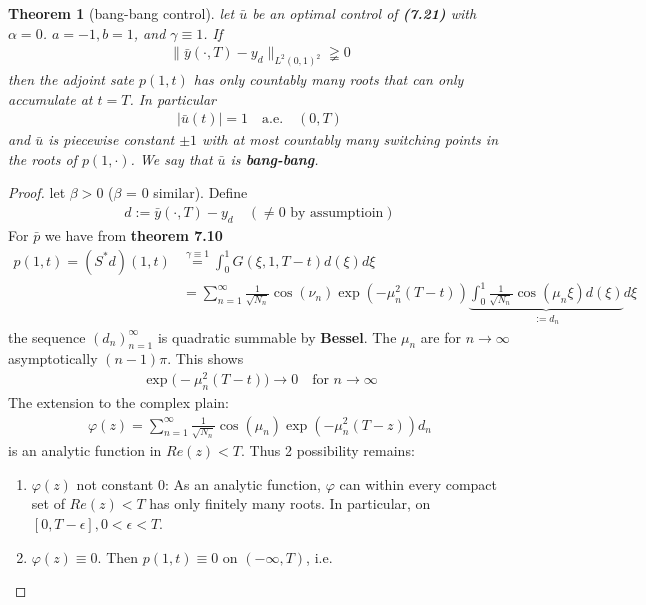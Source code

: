 \documentclass[a4paper,11pt,fleqn]{book}
\newtheorem{theorem}{Theorem}[section]
\theoremstyle{definition}
\theoremstyle{remark}
\begin{document}
\begin{theorem}[bang-bang control]
	let $\bar{u}$ be an optimal control of \textbf{(7.21)} with $\alpha = 0$. $a = -1, b = 1$, and $\gamma \equiv 1$. If 
	\begin{align*}
		\|\bar{y}( \cdot, T) - y_d \|_{L^2(0, 1)^2} \gneqq 0
	\end{align*}
	then the adjoint sate $p(1, t)$ has only countably many roots that can only accumulate at $t = T$. In particular
	\begin{align*}
		|\bar{u}(t)| = 1 \quad \text{a.e.} \quad (0, T)
	\end{align*}
	and $\bar{u}$ is piecewise constant $\pm 1$ with at most countably many switching points in the roots of $p(1, \cdot)$. We say that $\bar{u}$ is \textbf{bang-bang}.
\end{theorem}
\begin{proof}
	let $\beta > 0$ ($\beta$ = 0 similar). Define
	\begin{align*}
		d:= \bar{y} (\cdot, T) - y_d \quad (\neq 0 \text{ by assumptioin})
	\end{align*}
	For $\bar{p}$ we have from \textbf{theorem 7.10}
	\begin{align*}
		p(1, t) = (S^* d)(1, t) &\overset{\gamma \equiv 1}{=} \int_0^1 G(\xi, 1, T - t) d(\xi) d\xi\\
		&= \sum_{n = 1}^\infty \frac{1}{\sqrt{N_n}} \cos(\nu_n) \exp( - \mu_n^2(T - t)) \underbrace{\int_0^1  \frac{1}{\sqrt{N_n}} \cos(\mu_n \xi) d(\xi)}_{:= d_n} d\xi
	\end{align*}
	the sequence $(d_n)^\infty_{n = 1}$ is quadratic summable by \textbf{Bessel}. The $\mu_n$ are for $n \rightarrow \infty$ asymptotically $(n - 1) \pi$. This shows
	\begin{align*}
		\exp\bigg( - \mu_n^2(T - t) \bigg) \rightarrow 0 \quad \text{for } n \rightarrow \infty
	\end{align*}
	The extension to the complex plain:
	\begin{align*}
		\varphi(z) = \sum_{n = 1}^\infty \frac{1}{\sqrt{N_n}} \cos(\mu_n) \exp(-\mu_n^2 (T - z) ) d_n
	\end{align*}
	is an analytic function in $Re(z) < T$. 
	Thus 2 possibility remains:
	\begin{enumerate}
		\item $\varphi(z)$ not constant 0: As an analytic function, $\varphi$ can within every compact set of $Re(z) < T$ has only finitely many roots. In particular, on $[0, T - \epsilon], 0 < \epsilon < T$.
		\item $\varphi(z) \equiv 0$. Then $p(1, t) \equiv 0$ on $(-\infty, T)$, i.e. 

\end{enumerate}
\end{proof}
\end{document}
